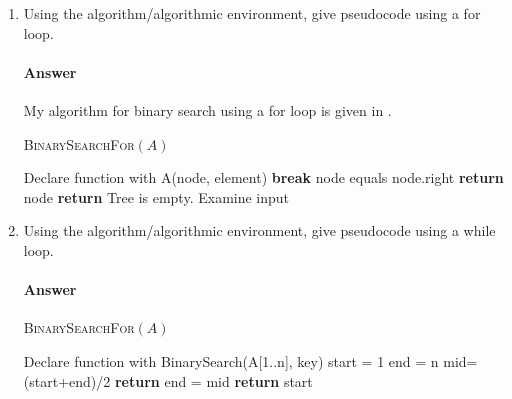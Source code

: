 \documentclass{article}
\begin{document}
\begin{enumerate}
    \item Using the algorithm/algorithmic environment,
        give pseudocode using a for loop.

        \paragraph{Answer} My algorithm for binary search using a for loop is given in .

        \begin{algorithm}
            \caption{\textsc{BinarySearchFor}$(A)$}\label{alg:forloop}
            \begin{algorithmic}
                \State Declare function with A(node, element)
                    \State \textbf{break}
                \EndIf
                    \State node equals node.right
                    \State \textbf{return} node
                \EndIf
                    \State \textbf{return} Tree is empty. Examine input
                \EndIf
                \EndFor
                \State 
            \end{algorithmic}
        \end{algorithm}

    \item Using the algorithm/algorithmic environment, give pseudocode using a while loop.

        \paragraph{Answer}

        \begin{algorithm}
            \caption{\textsc{BinarySearchFor}$(A)$}\label{alg:whileloop}
            \begin{algorithmic}
                \State Declare function with BinarySearch(A[1..n], key)
                \State start = 1
                \State end = n
                \State mid=(start+end)/2
                    \State \textbf{return} end = mid
                \EndIf
                    \State \textbf{return} start
                \EndIf
                \EndWhile


\end{algorithmic}
\end{algorithm}
\end{enumerate}
\end{document}
